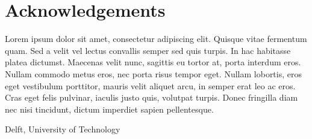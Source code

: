 %
\chapter{Acknowledgements}%
Lorem ipsum dolor sit amet, consectetur adipiscing elit. Quisque vitae fermentum quam. Sed a velit vel lectus convallis semper sed quis turpis. In hac habitasse platea dictumst. Maecenas velit nunc, sagittis eu tortor at, porta interdum eros. Nullam commodo metus eros, nec porta risus tempor eget. Nullam lobortis, eros eget vestibulum porttitor, mauris velit aliquet arcu, in semper erat leo ac eros. Cras eget felis pulvinar, iaculis justo quis, volutpat turpis. Donec fringilla diam nec nisi tincidunt, dictum imperdiet sapien pellentesque.



\vspace*{15mm}

Delft, University of Technology \hfill \mscname \\
\mscdate